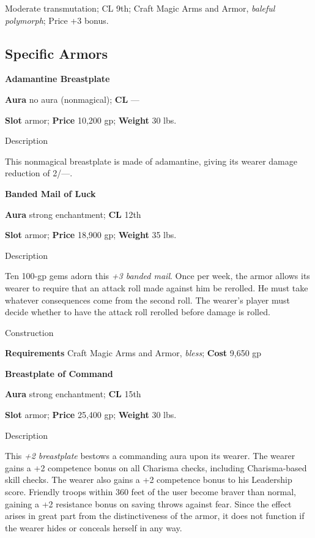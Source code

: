 Moderate transmutation; CL 9th; Craft Magic Arms and Armor, \textit{baleful polymorph}; Price +3 bonus.
				
\subsection{Specific Armors}

				
\textbf{Adamantine Breastplate}
				
\textbf{Aura} no aura (nonmagical); \textbf{CL} ---
				
\textbf{Slot} armor; \textbf{Price} 10,200 gp; \textbf{Weight} 30 lbs.
				
Description
				
This nonmagical breastplate is made of adamantine, giving its wearer damage reduction of 2/---. 
				
\textbf{Banded Mail of Luck}
				
\textbf{Aura} strong enchantment; \textbf{CL} 12th
				
\textbf{Slot} armor; \textbf{Price} 18,900 gp; \textbf{Weight} 35 lbs.
				
Description
				
Ten 100-gp gems adorn this \textit{+3 banded mail}. Once per week, the armor allows its wearer to require that an attack roll made against him be rerolled. He must take whatever consequences come from the second roll. The wearer's player must decide whether to have the attack roll rerolled before damage is rolled. 
				
Construction
				
\textbf{Requirements} Craft Magic Arms and Armor, \textit{bless}; \textbf{Cost }9,650 gp
				
\textbf{Breastplate of Command}
				
\textbf{Aura} strong enchantment; \textbf{CL} 15th
				
\textbf{Slot} armor; \textbf{Price} 25,400 gp; \textbf{Weight} 30 lbs.
				
Description
				
This \textit{+2 breastplate} bestows a commanding aura upon its wearer. The wearer gains a +2 competence bonus on all Charisma checks, including Charisma-based skill checks. The wearer also gains a +2 competence bonus to his Leadership score. Friendly troops within 360 feet of the user become braver than normal, gaining a +2 resistance bonus on saving throws against fear. Since the effect arises in great part from the distinctiveness of the armor, it does not function if the wearer hides or conceals herself in any way. 
				

